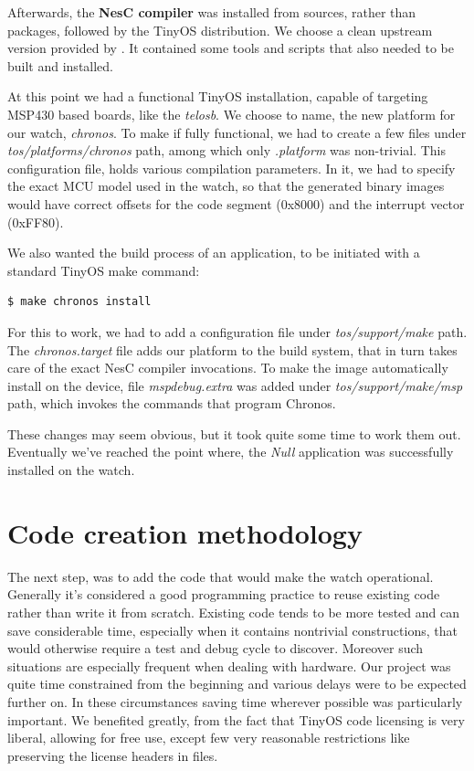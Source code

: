Afterwards, the {\bf NesC compiler} was installed from sources, rather than packages, followed by the TinyOS distribution. We choose a clean upstream version provided by \cite{TOSnet}. It contained some tools and scripts that also needed to be built and installed.

At this point we had a functional TinyOS installation, capable of targeting MSP430 based boards, like the \emph{telosb}. We choose to name, the new platform for our watch, \emph{chronos}. To make if fully functional, we had to create a few files under \emph{tos/platforms/chronos} path, among which only \emph{.platform} was non-trivial. This configuration file, holds various compilation parameters. In it, we had to specify the exact MCU model used in the watch, so that the generated binary images would have correct offsets for the code segment (0x8000) and the interrupt vector (0xFF80).

We also wanted the build process of an application, to be initiated with a standard TinyOS make command:
\begin{lstlisting}[numbers=none, language=bash]
  $ make chronos install
\end{lstlisting}
For this to work, we had to add a configuration file under \emph{tos/support/make} path. The \emph{chronos.target} file adds our platform to the build system, that in turn takes care of the exact NesC compiler invocations. To make the image automatically install on the device, file \emph{mspdebug.extra} was added under \emph{tos/support/make/msp} path, which invokes the commands that program Chronos.

These changes may seem obvious, but it took quite some time to work them out. Eventually we've reached the point where, the \emph{Null} application was successfully installed on the watch.

\section{Code creation methodology}

The next step, was to add the code that would make the watch operational. Generally it's considered a good programming practice to reuse existing code rather than write it from scratch. Existing code tends to be more tested and can save considerable time, especially when it contains nontrivial constructions, that would otherwise require a test and debug cycle to discover. Moreover such situations are especially frequent when dealing with hardware. Our project was quite time constrained from the beginning and various delays were to be expected further on. In these circumstances saving time wherever possible was particularly important. We benefited greatly, from the fact that TinyOS code licensing is very liberal, allowing for free use, except few very reasonable restrictions like preserving the license headers in files.

